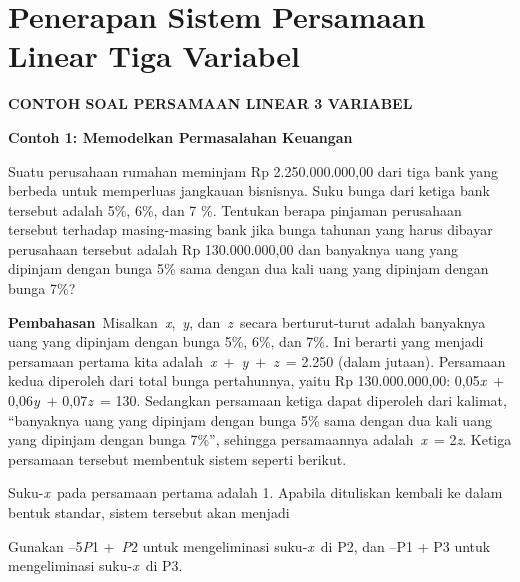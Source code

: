 \documentclass[11pt,fleqn]{book} %
\begin{document}
\noindent 

\noindent 


\section{Penerapan Sistem Persamaan Linear Tiga Variabel}


\noindent \textbf{CONTOH SOAL PERSAMAAN LINEAR 3 VARIABEL}

\noindent \textbf{}

\noindent \textbf{Contoh 1: Memodelkan Permasalahan Keuangan}

\noindent Suatu perusahaan rumahan meminjam Rp 2.250.000.000,00 dari tiga bank yang berbeda untuk memperluas jangkauan bisnisnya. Suku bunga dari ketiga bank tersebut adalah 5\%, 6\%, dan 7 \%. Tentukan berapa pinjaman perusahaan tersebut terhadap masing-masing bank jika bunga tahunan yang harus dibayar perusahaan tersebut adalah Rp 130.000.000,00 dan banyaknya uang yang dipinjam dengan bunga 5\% sama dengan dua kali uang yang dipinjam dengan bunga 7\%?

\noindent \textbf{}

\noindent \textbf{Pembahasan}~Misalkan~\textit{x},~\textit{y}, dan~\textit{z}~secara berturut-turut adalah banyaknya uang yang dipinjam dengan bunga 5\%, 6\%, dan 7\%. Ini berarti yang menjadi persamaan pertama kita adalah~\textit{x}~+~\textit{y}~+~\textit{z}~= 2.250 (dalam jutaan). Persamaan kedua diperoleh dari total bunga pertahunnya, yaitu Rp 130.000.000,00: 0,05\textit{x}~+ 0,06\textit{y}~+ 0,07\textit{z}~= 130. Sedangkan persamaan ketiga dapat diperoleh dari kalimat, ``banyaknya uang yang dipinjam dengan bunga 5\% sama dengan dua kali uang yang dipinjam dengan bunga 7\%'', sehingga persamaannya adalah~\textit{x}~= 2\textit{z}. Ketiga persamaan tersebut membentuk sistem seperti berikut.

\noindent 

\noindent 

\noindent Suku-\textit{x}~pada persamaan pertama adalah 1. Apabila dituliskan kembali ke dalam bentuk standar, sistem tersebut akan menjadi

\noindent 

\noindent 

\noindent Gunakan --5\textit{P}1 +~\textit{P}2 untuk mengeliminasi suku-\textit{x}~di P2, dan --P1 + P3 untuk mengeliminasi suku-\textit{x}~di P3.
\end{document}
